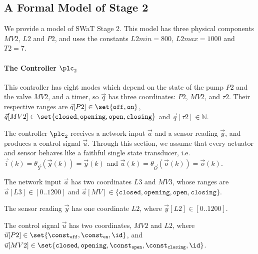 {\subsection{A Formal Model of Stage 2}
We provide a model of SWaT Stage 2. This model has three physical components $MV2$, $L2$ and $P2$, and uses the constants $L2min=800$, $L2max=1000$ and $T2=7$.

\paragraph{The Controller $\plc_2$} 
This controller has eight modes which depend on the state of the pump $P2$ and the valve $MV2$, and a timer, so $\vec{q}$ has three coordinates: $P2$, $MV2$, and $\tau2$. Their respective ranges are $\vec{q}[P2]\in\set{\texttt{off},\texttt{on}}$, $\vec{q}[MV2]\in\set{\texttt{closed},\texttt{opening},\texttt{open},\texttt{closing}}$ and $\vec{q}[\tau2]\in\mathbb{N}$. 

The controller $\plc_2$ receives a network input $\vec{a}$ and a sensor reading $\vec{y}$, and produces a control signal $\vec{u}$. Through this section, we assume that every actuator and sensor behaves like a faithful single state transducer, i.e. $\vec{i}(k)=\theta_{\vec{Y}}(\vec{y}(k))=\vec{y}(k)$ and $\vec{u}(k)=\theta_{\vec{O}}(\vec{o}(k))=\vec{o}(k)$.

The network input $\vec{a}$ has two coordinates $L3$ and $MV3$, whose ranges are $\vec{a}[L3]\in[0..1200]$ and $\vec{a}[MV]\in \{\texttt{closed},\texttt{opening},\texttt{open},\texttt{closing}\}$. 

The sensor reading $\vec{y}$ has one coordinate $L2$, where $\vec{y}[L2]\in[0..1200]$. 

The control signal $\vec{u}$ has two coordinates, $MV2$ and $L2$, where $\vec{u}[P2]\in\set{\const_\texttt{off},\const_\texttt{on},\id}$, and $\vec{u}[MV2]\in\set{\texttt{closed},\texttt{opening},\const_\texttt{open},\const_\texttt{closing}, \id}$.

}
